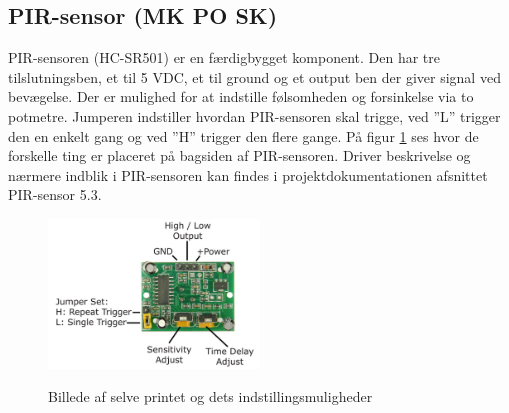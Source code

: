 \subsection{PIR-sensor (MK PO SK)}

PIR-sensoren (HC-SR501) er en færdigbygget komponent. Den har tre tilslutningsben, et til 5 VDC, et til ground og et output ben der giver signal ved bevægelse. Der er mulighed for at indstille følsomheden og forsinkelse via to potmetre. Jumperen indstiller hvordan PIR-sensoren skal trigge, ved ''L'' trigger den en enkelt gang og ved ''H'' trigger den flere gange. På figur \ref{lab:pir_overview} ses hvor de forskelle ting er placeret på bagsiden af PIR-sensoren. Driver beskrivelse og nærmere indblik i PIR-sensoren kan findes i projektdokumentationen afsnittet PIR-sensor 5.3. 

\begin{figure}[H] \centering
{\includegraphics[width=0.5\textwidth]{Billeder/pir_overview}}
\caption{Billede af selve printet og dets indstillingsmuligheder}
\label{lab:pir_overview}
\raggedright
\end{figure}



